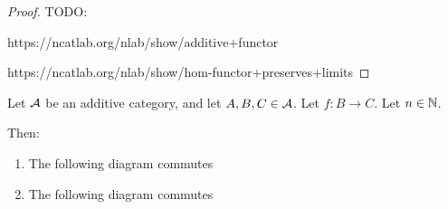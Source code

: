 \begin{proof}
    TODO: 
    
    https://ncatlab.org/nlab/show/additive+functor

    https://ncatlab.org/nlab/show/hom-functor+preserves+limits
\end{proof}


\begin{theorem} \label{thm:hom_direct_sum_map_nice}
    Let \( {\mathcal{A}} \) be an additive category, and let \( A, B, C \in {\mathcal{A}} \). Let \( f: B \to C \). Let \( n \in {\mathbb{N}} \).

    Then:
    \begin{enumerate}
        \item {
            The following diagram commutes
            \begin{center}
            \end{center}
        }
        \item {
            The following diagram commutes
            \begin{center}
\end{center}}
\end{enumerate}
\end{theorem}
